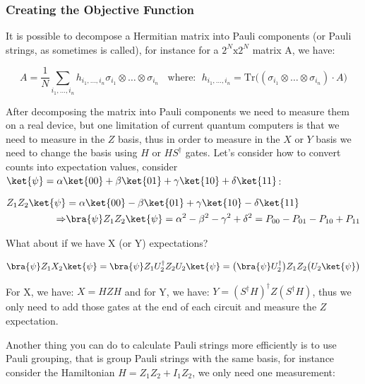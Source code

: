 \subsubsection{Creating the Objective Function}
\label{Subsubsec: Creating the Objective Function}

It is possible to decompose a Hermitian matrix into Pauli components (or Pauli strings, as sometimes is called), for instance for a $2^N \mathrm{x} 2^N$ matrix A, we have:

\begin{equation*}
    A = \frac{1}{N} \sum_{i_1,\dots,i_n} h_{i_1, \dots, i_n} \sigma_{i_1} \otimes \dots \otimes \sigma_{i_n} \ \ \ \ \mathrm{where}: \ \ h_{i_1, \dots, i_n} = \mathrm{Tr} \big( (\sigma_{i_1} \otimes \dots \otimes \sigma_{i_n}) \cdot A \big)
\end{equation*}

After decomposing the matrix into Pauli components we need to measure them on a real device, but one limitation of current quantum computers is that we need to measure in the $Z$ basis, thus in order to measure in the $X$ or $Y$ basis we need to change the basis using $H$ or $HS^\dagger$ gates. Let's consider how to convert counts into expectation values, consider $\ket{\psi} = \alpha \ket{00} + \beta \ket{01} + \gamma \ket{10} + \delta \ket{11}$:

\begin{equation}
\begin{split}
    Z_1 Z_2 \ket{\psi} & = \alpha \ket{00} - \beta \ket{01} + \gamma \ket{10} - \delta \ket{11} \\ 
    \Rightarrow & \bra{\psi} Z_1 Z_2 \ket{\psi} = \alpha^2 - \beta^2 - \gamma^2 + \delta^2 = P_{00} - P_{01} - P_{10} + P_{11}
\end{split}
\end{equation}

What about if we have X (or Y) expectations?

\begin{equation*}
    \bra{\psi} Z_1 X_2 \ket{\psi} = \bra{\psi} Z_1 U_2^\dagger Z_2 U_2 \ket{\psi} = \big( \bra{\psi} U_2^\dagger \big) Z_1 Z_2 \big( U_2 \ket{\psi} \big)
\end{equation*}

For X, we have: $X = HZH$ and for Y, we have: $Y = (S^\dagger H)^\dagger Z (S^\dagger H)$, thus we only need to add those gates at the end of each circuit and measure the $Z$ expectation.

Another thing you can do to calculate Pauli strings more efficiently is to use Pauli grouping, that is group Pauli strings with the same basis, for instance consider the Hamiltonian $H = Z_1 Z_2 + I_1 Z_2$, we only need one measurement:


